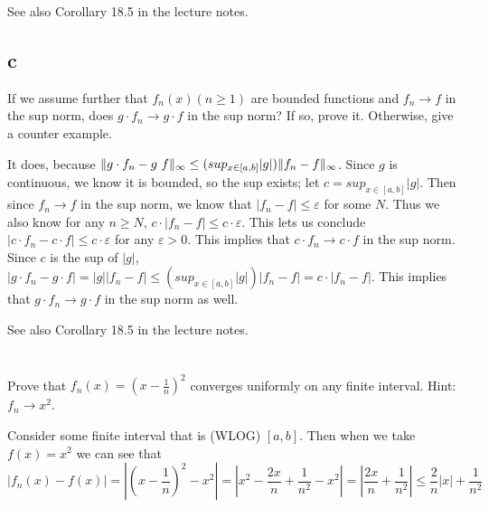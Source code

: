 \documentclass[]{article}
\DeclarePairedDelimiter\norm{\lVert}{\rVert}
\begin{document}


			See also Corollary 18.5 in the lecture notes. 

		\subsection*{c}
			\begin{em}
				If we assume further that $f_n(x) (n \geq 1)$ are bounded functions and $f_n \to f$ in the sup norm, does $g \cdot f_n \to g \cdot f$ in the sup norm? If so, prove it. Otherwise, give a counter example.
			\end{em}

			It does, because $\norm{g \cdot f_n - g\ f}_\infty \leq (sup_{x \in [a, b]}|g|) \norm{f_n - f}_\infty$. Since $g$ is continuous, we know it is bounded, so the sup exists; let $c = sup_{x \in [a, b]}|g|$. Then since $f_n \to f$ in the sup norm, we know that $|f_n - f| \leq \varepsilon$ for some $N$. Thus we also know for any $n \geq N$, $c \cdot |f_n - f| \leq c \cdot \varepsilon$. This lets us conclude $|c \cdot f_n - c \cdot f| \leq c \cdot \varepsilon$ for any $\varepsilon > 0$. This implies that $c \cdot f_n \to c \cdot f$ in the sup norm. Since $c$ is the sup of $|g|$, $|g \cdot f_n - g \cdot f| = |g||f_n -f| \leq (sup_{x \in [a,b]} |g|)|f_n - f| = c \cdot |f_n - f|$. This implies that $g \cdot f_n \to g \cdot f$ in the sup norm as well.

			See also Corollary 18.5 in the lecture notes. 

	\section{}
		\begin{em}
			Prove that $f_n(x) = \left ( x - \frac{1}{n} \right ) ^2$ converges uniformly on any finite interval. Hint: $f_n \to x^2$. 
		\end{em}

		Consider some finite interval that is (WLOG) $[a, b]$. Then when we take $f(x) = x^2$ we can see that 
		\[|f_n(x) - f(x)| = \left |\left ( x - \frac{1}{n} \right ) ^2 - x^2 \right | = \left |x^2 - \frac{2x}{n} + \frac{1}{n^2} - x^2 \right | = \left |\frac{2x}{n} + \frac{1}{n^2} \right | \leq \frac{2}{n}|x| + \frac{1}{n^2}\] 
\end{document}
